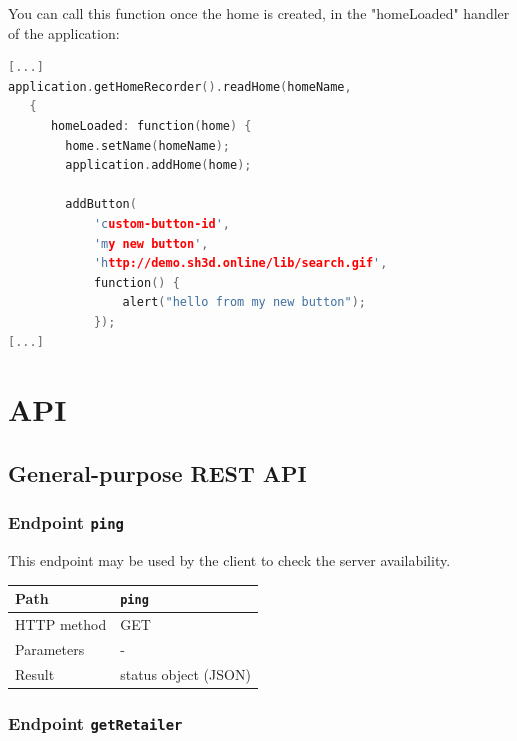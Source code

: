 \documentclass[a4paper]{report}
\begin{document}
You can call this function once the home is created, in the "homeLoaded" handler of the application:

\begin{lstlisting}[language=c++]
[...]
application.getHomeRecorder().readHome(homeName, 
   {
      homeLoaded: function(home) {
        home.setName(homeName);
        application.addHome(home);

        addButton(
        	'custom-button-id', 
        	'my new button', 
        	'http://demo.sh3d.online/lib/search.gif', 
        	function() {
	        	alert("hello from my new button");
    	    });
[...]
\end{lstlisting}

\chapter{API}

\section{General-purpose REST API}

\subsection{Endpoint \texttt{ping}}

This endpoint may be used by the client to check the server availability.

\begin{center}
\begin{tabularx} {\textwidth} { | l | X | }

\hline

Path & \texttt{ping} \\

\hline

HTTP method & GET \\

\hline

Parameters & - \\

\hline

Result & status object (JSON) \\

\hline

\end{tabularx}
\end{center}

\subsection{Endpoint \texttt{getRetailer}}
\end{document}
